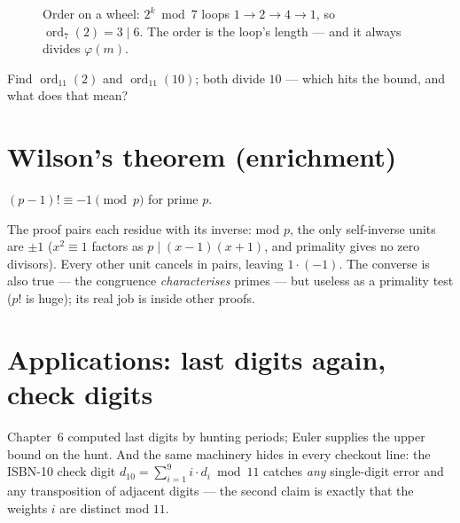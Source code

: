 \begin{figure}[ht]\centering

\caption{Order on a wheel: $2^k \bmod 7$ loops
$1 \to 2 \to 4 \to 1$, so $\operatorname{ord}_7(2) = 3 \mid 6$. The order
is the loop's length --- and it always divides $\varphi(m)$.}
\label{fig:orderwheel}
\end{figure}

\begin{exercise}[medium]\label{exr:ord}
Find $\operatorname{ord}_{11}(2)$ and $\operatorname{ord}_{11}(10)$;
both divide $10$ --- which hits the bound, and what does that mean?
\end{exercise}

\section{Wilson's theorem (enrichment)}\label{sec:wilson}

\begin{theorem}
$(p-1)! \equiv -1 \pmod p$ for prime $p$.
\end{theorem}

The proof pairs each residue with its inverse: mod $p$, the only
self-inverse units are $\pm 1$ ($x^2 \equiv 1$ factors as
$p \mid (x-1)(x+1)$, and primality gives no zero divisors). Every other
unit cancels in pairs, leaving $1 \cdot (-1)$. The converse is also true
--- the congruence \emph{characterises} primes --- but useless as a
primality test ($p!$ is huge); its real job is inside other proofs.

\section{Applications: last digits again, check digits}\label{sec:apps}

Chapter~6 computed last digits by hunting periods; Euler supplies the
upper bound on the hunt. And the same machinery hides in every checkout
line: the ISBN-10 check digit $d_{10} = \sum_{i=1}^{9} i \cdot d_i \bmod
{11}$ catches \emph{any} single-digit error and any transposition of
adjacent digits --- the second claim is exactly that the weights
$i$ are distinct mod $11$.


